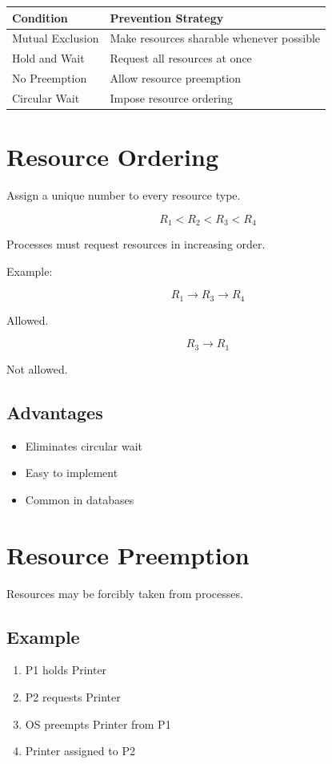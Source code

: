 \begin{longtable}{|p{4cm}|p{9cm}|}
\hline
Condition & Prevention Strategy \\
\hline
Mutual Exclusion & Make resources sharable whenever possible \\
\hline
Hold and Wait & Request all resources at once \\
\hline
No Preemption & Allow resource preemption \\
\hline
Circular Wait & Impose resource ordering \\
\hline
\end{longtable}

\section{Resource Ordering}

Assign a unique number to every resource type.

\[
R_1 < R_2 < R_3 < R_4
\]

Processes must request resources in increasing order.

Example:

\[
R_1 \rightarrow R_3 \rightarrow R_4
\]

Allowed.

\[
R_3 \rightarrow R_1
\]

Not allowed.

\subsection{Advantages}

\begin{itemize}
\item Eliminates circular wait
\item Easy to implement
\item Common in databases
\end{itemize}

\section{Resource Preemption}

Resources may be forcibly taken from processes.

\subsection{Example}

\begin{enumerate}
\item P1 holds Printer
\item P2 requests Printer
\item OS preempts Printer from P1
\item Printer assigned to P2
\end{enumerate}

